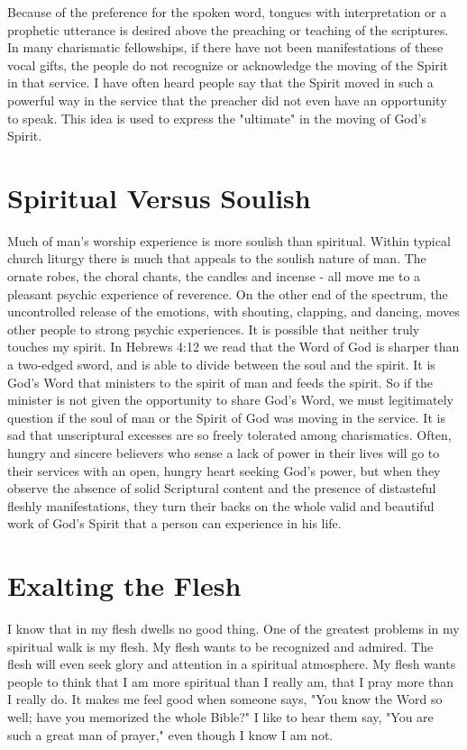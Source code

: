 Because of the preference for the spoken word, tongues with interpretation or a prophetic utterance is desired above the preaching or teaching of the scriptures. In many charismatic fellowships, if there have not been manifestations of these vocal gifts, the people do not recognize or acknowledge the moving of the Spirit in that service. I have often heard people say that the Spirit moved in such a powerful way in the service that the preacher did not even have an opportunity to speak. This idea is used to express the "ultimate" in the moving of God's Spirit. 

\section*{Spiritual Versus Soulish}

Much of man's worship experience is more soulish than spiritual. Within typical church liturgy there is much that appeals to the soulish nature of man. The ornate robes, the choral chants, the candles and incense - all move me to a pleasant psychic experience of reverence. On the other end of the spectrum, the uncontrolled release of the emotions, with shouting, clapping, and dancing, moves other people to strong psychic experiences. It is possible that neither truly touches my spirit. In Hebrews 4:12 we read that the Word of God is sharper than a two-edged sword, and is able to divide between the soul and the spirit. It is God's Word that ministers to the spirit of man and feeds the spirit. So if the minister is not given the opportunity to share God's Word, we must legitimately question if the soul of man or the Spirit of God was moving in the service. It is sad that unscriptural excesses are so freely tolerated among charismatics. Often, hungry and sincere believers who sense a lack of power in their lives will go to their services with an open, hungry heart seeking God's power, but when they observe the absence of solid Scriptural content and the presence of distasteful fleshly manifestations, they turn their backs on the whole valid and beautiful work of God's Spirit that a person can experience in his life. 

\section*{Exalting the Flesh}

I know that in my flesh dwells no good thing. One of the greatest problems in my spiritual walk is my flesh. My flesh wants to be recognized and admired. The flesh will even seek glory and attention in a spiritual atmosphere. My flesh wants people to think that I am more spiritual than I really am, that I pray more than I really do. It makes me feel good when someone says, "You know the Word so well; have you memorized the whole Bible?" I like to hear them say, "You are such a great man of prayer," even though I know I am not. 

